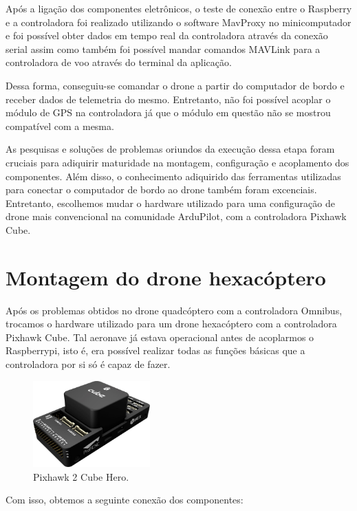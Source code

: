 \documentclass[12pt,a4paper,oneside]{book}
\begin{document}
Após a ligação dos componentes eletrônicos, o teste de conexão entre o Raspberry e a controladora foi realizado utilizando o software MavProxy no minicomputador e foi possível obter dados em tempo real da controladora através da conexão serial assim como também foi possível mandar comandos MAVLink para a controladora de voo através do terminal da aplicação.

Dessa forma, conseguiu-se comandar o drone a partir do computador de bordo e receber dados de telemetria do mesmo. Entretanto, não foi possível acoplar o módulo de GPS na controladora já que o módulo em questão não se mostrou compatível com a mesma.

As pesquisas e soluções de problemas oriundos da execução dessa etapa foram cruciais para adiquirir maturidade na montagem, configuração e acoplamento dos componentes. Além disso, o conhecimento adiquirido das ferramentas utilizadas para conectar o computador de bordo ao drone também foram excenciais. Entretanto, escolhemos mudar o hardware utilizado para uma configuração de drone mais convencional na comunidade ArduPilot, com a controladora Pixhawk Cube. 


\section{Montagem do drone hexacóptero}

Após os problemas obtidos no drone quadcóptero com a controladora Omnibus, trocamos o hardware utilizado para um drone hexacóptero com a controladora Pixhawk Cube. Tal aeronave já estava operacional antes de acoplarmos o Raspberrypi, isto é, era possível realizar todas as funções básicas que a controladora por si só é capaz de fazer.
%
\begin{figure}[!htbp]
  \centering
  \includegraphics[width=0.4\textwidth]{Images/Desenvolvimento/pixhawk2_cube_hero.png}
  \caption{Pixhawk 2 Cube Hero.}
  \label{fig:pixhawk2_cube_hero.png.0}
\end{figure}
%

Com isso, obtemos a seguinte conexão dos componentes:
\end{document}
